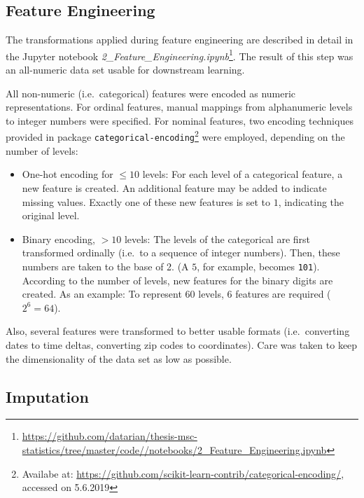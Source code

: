 \documentclass[
  11pt,
  a4paper,
  DIV=12,captions=tableheading,oneside,titlepage]{scrbook}
\begin{document}
\hypertarget{methods-feature-engineering}{%
\subsection{Feature Engineering}\label{methods-feature-engineering}}

The transformations applied during feature engineering are described in detail in the Jupyter notebook \emph{2\_Feature\_Engineering.ipynb}\footnote{\url{https://github.com/datarian/thesis-msc-statistics/tree/master/code//notebooks/2_Feature_Engineering.ipynb}}. The result of this step was an all-numeric data set usable for downstream learning.

All non-numeric (i.e.~categorical) features were encoded as numeric representations. For ordinal features, manual mappings from alphanumeric levels to integer numbers were specified. For nominal features, two encoding techniques provided in package \texttt{categorical-encoding}\footnote{Availabe at: \url{https://github.com/scikit-learn-contrib/categorical-encoding/}, accessed on 5.6.2019} were employed, depending on the number of levels:

\begin{itemize}
\item
  One-hot encoding for \(\leq 10\) levels: For each level of a categorical feature, a new feature is created. An additional feature may be added to indicate missing values. Exactly one of these new features is set to \(1\), indicating the original level.
\item
  Binary encoding, \(> 10\) levels: The levels of the categorical are first transformed ordinally (i.e.~to a sequence of integer numbers). Then, these numbers are taken to the base of 2. (A \(5\), for example, becomes \texttt{101}). According to the number of levels, new features for the binary digits are created. As an example: To represent 60 levels, 6 features are required (\(2^6=64\)).
\end{itemize}

Also, several features were transformed to better usable formats (i.e.~converting dates to time deltas, converting zip codes to coordinates). Care was taken to keep the dimensionality of the data set as low as possible.

\hypertarget{imputation}{%
\subsection{Imputation}\label{imputation}}
\end{document}
